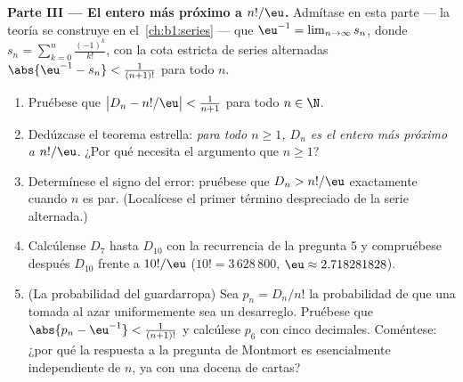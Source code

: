 \begin{problem}
\medskip
\noindent\textbf{Parte III --- El entero más próximo a
$n!/\eu$.} Admítase en esta parte --- la teoría se construye en
el~\cref{ch:b1:series} --- que
$\eu^{-1} = \lim_{n \to \infty} s_n$, donde $s_n = \sum_{k=0}^{n}
\frac{(-1)^k}{k!}$, con la cota estricta de series alternadas
$\abs{\eu^{-1} - s_n} < \frac1{(n+1)!}$ para todo $n$.
\begin{enumerate}[resume]
  \item Pruébese que $\bigl| D_n - n!/\eu \bigr| < \frac1{n+1}$ para
        todo $n \in \N$.
  \item Dedúzcase el teorema estrella: \emph{para todo $n \geq 1$,
        $D_n$ es el entero más próximo a $n!/\eu$}. ¿Por qué necesita el
        argumento que $n \geq 1$?
  \item Determínese el signo del error: pruébese que $D_n > n!/\eu$
        exactamente cuando $n$ es par. (Localícese el primer término
        despreciado de la serie alternada.)
  \item Calcúlense $D_7$ hasta $D_{10}$ con la recurrencia de la
        pregunta 5 y compruébese después $D_{10}$ frente a $10!/\eu$
        ($10! = 3\,628\,800$, $\eu \approx 2.718281828$).
  \item (La probabilidad del guardarropa) Sea $p_n = D_n/n!$ la
        probabilidad de que una  tomada al azar
        uniformemente sea un desarreglo. Pruébese que
        $\abs{p_n - \eu^{-1}} < \frac1{(n+1)!}$ y calcúlese $p_6$ con
        cinco decimales. Coméntese: ¿por qué la respuesta a la pregunta
        de Montmort es esencialmente independiente de $n$, ya con una
        docena de cartas?
\end{enumerate}


\end{problem}
